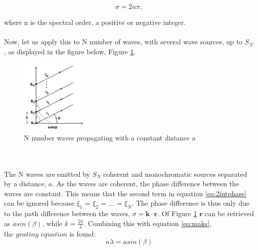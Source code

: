 \begin{equation}
    \sigma = 2 n \pi,
    \label{eq:maks}
\end{equation}

where n is the spectral order, a positive or negative integer. 
\\\\
Now, let us apply this to N number of waves, with several wave sources, up to $S_N$, as displayed in the figure below, Figure \ref{fig:Ninterference}.
\begin{figure}[h]
  \centering
    \includegraphics[width=0.3\textwidth]{Images/theory/Ninterference.png}
    \caption{N number waves propagating with a constant distance a}
    \label{fig:Ninterference}
\end{figure}
\\\\
The N waves are emitted by $S_N$ coherent and monochromatic sources separated by a distance, $a$. As the waves are coherent, the phase difference between the waves are constant. This means that the second term in equation \ref{eq:2intphase} can be ignored because $\xi_1$ = $\xi_2$ = ... = $\xi_N$. The phase difference is thus only due to the path difference between the waves, $\sigma = \textbf{k} \cdot \textbf{r}$. Of Figure \ref{fig:Ninterference}
$\textbf{r}$ can be retrieved as $a sin (\beta)$, while $k= \frac{2 \pi}{\lambda}$. Combining this with equation \ref{eq:maks}, $\textit{the grating equation}$ is found: 
\begin{equation}
    n \lambda = a sin(\beta)
    \label{eq:transgrating}
\end{equation}

\vspace{1.3cm}

